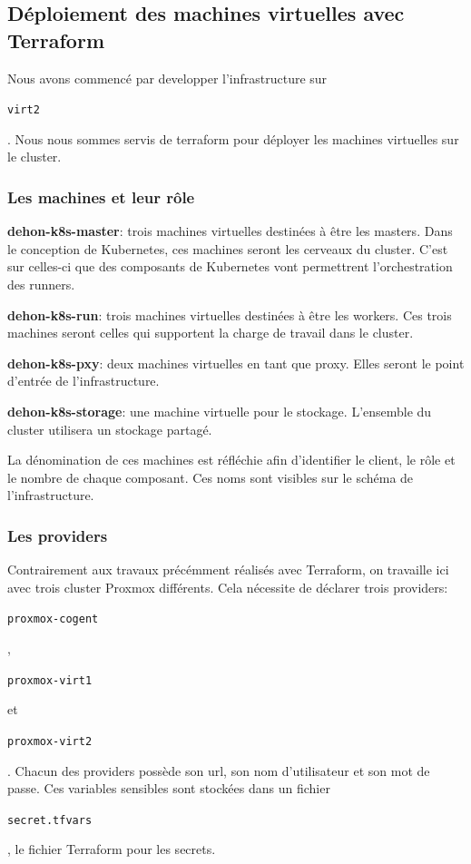 \documentclass[12pt, a4paper, twoside]{article}
\begin{document}
\newpage
\subsection{Déploiement des machines virtuelles avec Terraform}
Nous avons commencé par developper l'infrastructure sur \begin{code}\texttt{virt2}\end{code}. 
Nous nous sommes servis de terraform pour déployer les machines virtuelles sur le \gls{cluster}. 

\subsubsection{Les machines et leur rôle}

\textbf{dehon-k8s-master}: trois machines virtuelles destinées à être les masters. 
Dans le conception de \gls{Kubernetes}, ces machines seront les cerveaux du \gls{cluster}.
C'est sur celles-ci que des composants de \gls{Kubernetes} vont permettrent l'orchestration des runners.

\textbf{dehon-k8s-run}: trois machines virtuelles destinées à être les workers. 
Ces trois machines seront celles qui supportent la charge de travail dans le \gls{cluster}.

\textbf{dehon-k8s-pxy}: deux machines virtuelles en tant que proxy. 
Elles seront le point d'entrée de l'infrastructure. 

\textbf{dehon-k8s-storage}: une machine virtuelle pour le stockage. 
L'ensemble du \gls{cluster} utilisera un stockage partagé.

La dénomination de ces machines est réfléchie afin d'identifier le client, le rôle et le nombre de chaque composant. 
Ces noms sont visibles sur le schéma de l'infrastructure.

\subsubsection{Les providers}
Contrairement aux travaux précémment réalisés avec \gls{Terraform}, on travaille ici avec trois \gls{cluster} \gls{Proxmox} différents.
Cela nécessite de déclarer trois providers: \begin{code}\texttt{proxmox-cogent}\end{code},\begin{code}\texttt{proxmox-virt1}\end{code} et\begin{code}\texttt{proxmox-virt2}\end{code}.
Chacun des providers possède son url, son nom d'utilisateur et son mot de passe.
Ces variables sensibles sont stockées dans un fichier \begin{code}\texttt{secret.tfvars}\end{code}, le fichier \gls{Terraform} pour les secrets.
\end{document}
